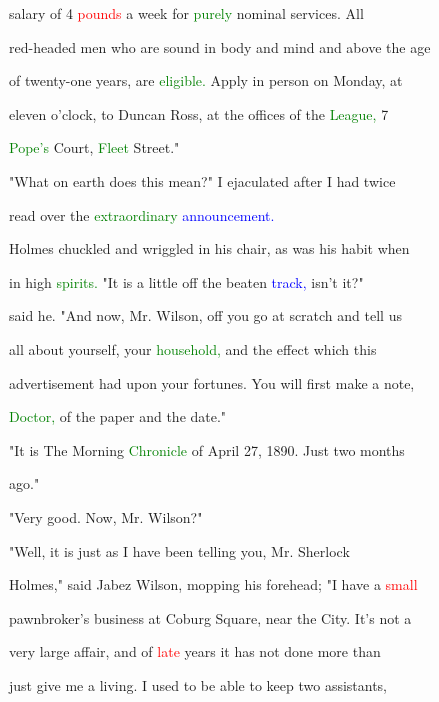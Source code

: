  \textcolor{BurntOrange}{salary} of 4 \textcolor{red}{pounds} a week for \textcolor{green}{purely} nominal services. All

 red-headed men who are sound in body and mind and above the age

 of twenty-one years, are \textcolor{green}{eligible.} Apply in person on Monday, at

 eleven o'clock, to Duncan Ross, at the offices of the \textcolor{green}{League,} 7

 \textcolor{green}{Pope's} \textcolor{BurntOrange}{Court,} \textcolor{green}{Fleet} Street."



 "What on earth does this mean?" I ejaculated after I had twice

 read over the \textcolor{green}{extraordinary} \textcolor{blue}{announcement.}



 Holmes \textcolor{BurntOrange}{chuckled} and wriggled in his chair, as was his habit when

 in high \textcolor{green}{spirits.} "It is a little off the beaten \textcolor{blue}{track,} isn't it?"

 said he. "And now, Mr. Wilson, off you go at scratch and tell us

 all about yourself, your \textcolor{green}{household,} and the effect which this

 advertisement had upon your \textcolor{BurntOrange}{fortunes.} You will first make a note,

 \textcolor{green}{Doctor,} of the paper and the date."



 "It is The Morning \textcolor{green}{Chronicle} of April 27, 1890. Just two months

 ago."



 "Very \textcolor{BurntOrange}{good.} Now, Mr. Wilson?"



 "Well, it is just as I have been telling you, Mr. Sherlock

 Holmes," said Jabez Wilson, mopping his forehead; "I have a \textcolor{red}{small}

 pawnbroker's business at Coburg Square, near the City. It's not a

 very large affair, and of \textcolor{red}{late} years it has not done more than

 just give me a living. I used to be able to keep two assistants,

